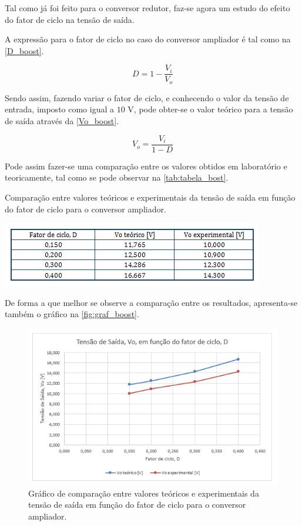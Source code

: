 \documentclass[a4paper,11pt]{article}
\numberwithin{equation}{section}
\begin{document}
Tal como já foi feito para o conversor redutor, faz-se agora um estudo do efeito do fator de ciclo na tensão de saída.

A expressão para o fator de ciclo no caso do conversor ampliador é tal como na \autoref{D_boost}.

\begin{equation}
	D = 1 - \frac{V_i}{V_o} \label{D_boost}
\end{equation}

Sendo assim, fazendo variar o fator de ciclo, e conhecendo o valor da tensão de entrada, imposto como igual a $10$ V, pode obter-se o valor teórico para a tensão de saída através da \autoref{Vo_boost}.

\begin{equation}
	V_o = \frac{V_i}{1-D} \label{Vo_boost}
\end{equation}


Pode assim fazer-se uma comparação entre os valores obtidos em laboratório e teoricamente, tal como se pode observar na \autoref{tab:tabela_bost}.

\begin{table}[!htb]
	\centering
	\caption{Comparação entre valores teóricos e experimentais da tensão de saída em função do fator de ciclo para o conversor ampliador.}
	\includegraphics[width=0.8\linewidth]{teoricas/tabela_boost}
	\label{tab:tabela_bost}
\end{table}

De forma a que melhor se observe a comparação entre os resultados, apresenta-se também o gráfico na \autoref{fig:graf_boost}.

\begin{figure}[H]
	\centering
	\includegraphics[keepaspectratio=true, scale=1.0]{teoricas/graf_boost}
	\caption{Gráfico de comparação entre valores teóricos e experimentais da tensão de saída em função do fator de ciclo para o conversor ampliador.}
	\label{fig:graf_boost}
	\vspace{-0.8em}
\end{figure}
\end{document}
